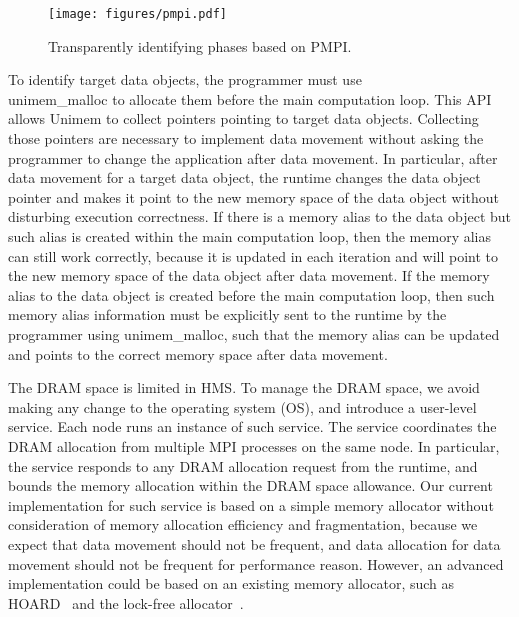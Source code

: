 \begin{figure}
	\vspace*{10pt}
    \centering
    \texttt{[image: figures/pmpi.pdf]}
    \caption{Transparently identifying phases based on PMPI.}
    \label{fig:pmpi}
    \vspace{-20pt}
\end{figure}

To identify target data objects, the programmer must use \\{\selectfont unimem\_malloc} to allocate them before the main computation loop.
This API allows Unimem to collect pointers pointing to target data objects.
Collecting those pointers are necessary to implement data movement without asking the programmer to change the application after data movement. 
In particular, after data movement for a target data object, the runtime changes the data object pointer and makes it point to the new memory space of the data object without disturbing execution correctness. If there is a memory alias to the data object but such alias is created within the main computation loop, then the memory alias can still work correctly, because it is updated in each iteration and will point to the new memory space of the data object after data movement.
If the memory alias to the data object is created before the main computation loop, then such memory alias information must be explicitly sent to the runtime by the programmer using {\selectfont unimem\_malloc}, such that the memory alias can be updated and points to the correct memory space after data movement.

The DRAM space is limited in HMS. To manage the DRAM space, we avoid making any change to the operating system (OS), and introduce
a user-level service. Each node runs an instance of such service.
The service coordinates the DRAM allocation from multiple MPI processes on the same node.
In particular, the service responds to any DRAM allocation request from the runtime, and bounds
the memory allocation within the DRAM space allowance.
Our current implementation for such service 
is based on a simple memory allocator without consideration of memory allocation efficiency and fragmentation,
because we expect that data movement should not be frequent, and data allocation for data movement should not be frequent for performance reason.
However, an advanced implementation could be based on an existing memory allocator, such as HOARD~\cite{asplos00:berger} and the lock-free allocator~\cite{pldi04:maged}.

